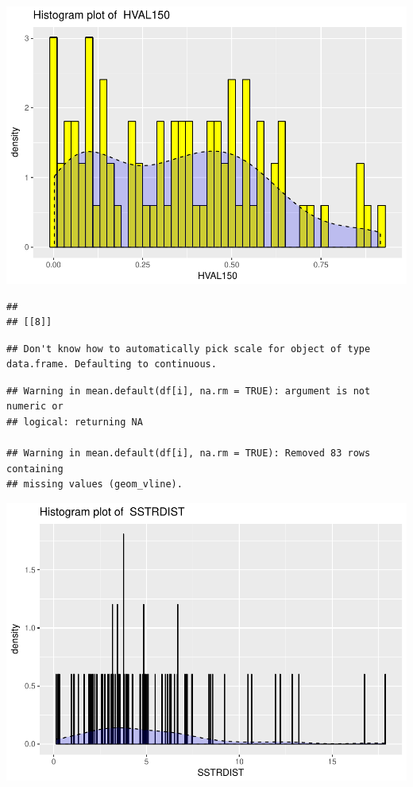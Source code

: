 \documentclass[]{article}
\begin{document}
\includegraphics{Desc_stats_files/figure-latex/unnamed-chunk-2-7.pdf}

\begin{verbatim}
## 
## [[8]]
\end{verbatim}

\begin{verbatim}
## Don't know how to automatically pick scale for object of type data.frame. Defaulting to continuous.
\end{verbatim}

\begin{verbatim}
## Warning in mean.default(df[i], na.rm = TRUE): argument is not numeric or
## logical: returning NA

## Warning in mean.default(df[i], na.rm = TRUE): Removed 83 rows containing
## missing values (geom_vline).
\end{verbatim}

\includegraphics{Desc_stats_files/figure-latex/unnamed-chunk-2-8.pdf}
\end{document}
